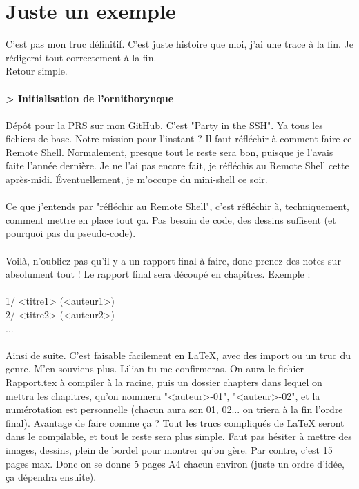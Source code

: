 \chapter[Exemple]{Juste un exemple}

C'est pas mon truc définitif. C'est juste histoire que moi, j'ai une trace à la fin. Je rédigerai tout correctement à la fin.
\\Retour simple.
\\\\
\textbf{> Initialisation de l'ornithorynque}
\\\\
Dépôt pour la PRS sur mon GitHub. C'est "Party in the SSH". Ya tous les fichiers de base. Notre mission pour l'instant ? Il faut réfléchir à comment faire ce Remote Shell.
Normalement, presque tout le reste sera bon, puisque je l'avais faite l'année dernière. Je ne l'ai pas encore fait, je réfléchis au Remote Shell cette après-midi. Éventuellement, je m'occupe du mini-shell ce soir.
\\\\
Ce que j'entends par "réfléchir au Remote Shell", c'est réfléchir à, techniquement, comment mettre en place tout ça. Pas besoin de code, des dessins suffisent (et pourquoi pas du pseudo-code).
\\\\
Voilà, n'oubliez pas qu'il y a un rapport final à faire, donc prenez des notes sur absolument tout ! Le rapport final sera découpé en chapitres. Exemple :
\\\\
1/ <titre1> (<auteur1>)
\\2/ <titre2> (<auteur2>)
\\...
\\\\
Ainsi de suite. C'est faisable facilement en LaTeX, avec des import ou un truc du genre. M'en souviens plus. Lilian tu me confirmeras. On aura le fichier Rapport.tex à compiler à la racine, puis un dossier chapters dans lequel on mettra les chapitres, qu'on nommera "<auteur>-01", "<auteur>-02", et la numérotation est personnelle (chacun aura son 01, 02... on triera à la fin l'ordre final). Avantage de faire comme ça ? Tout les trucs compliqués de LaTeX seront dans le compilable, et tout le reste sera plus simple. Faut pas hésiter à mettre des images, dessins, plein de bordel pour montrer qu'on gère. Par contre, c'est 15 pages max. Donc on se donne 5 pages A4 chacun environ (juste un ordre d'idée, ça dépendra ensuite).
\\\\
